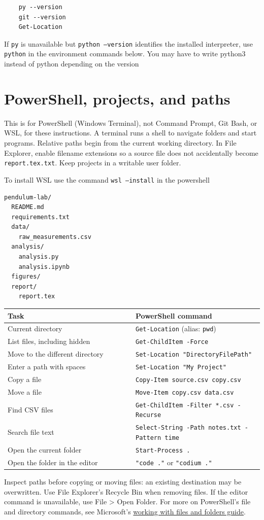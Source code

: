 \documentclass[11pt]{article}
\begin{document}
  \begin{lstlisting}
    py --version
    git --version
    Get-Location
  \end{lstlisting}
  If \texttt{py} is unavailable but \texttt{python --version} identifies the installed interpreter, use \texttt{python} in the environment commands below.
  You may have to write python3 instead of python depending on the version
\newpage


\section{PowerShell, projects, and paths}
This is for PowerShell (Windows Terminal), not Command Prompt,
Git Bash, or WSL, for these instructions. A terminal runs a shell to navigate
folders and start programs. Relative paths begin from the current working
directory. In File Explorer, enable filename extensions so a source file does
not accidentally become \texttt{report.tex.txt}. Keep projects in a writable
user folder.

To install WSL use the command \texttt{wsl --install} in the powershell

\begin{lstlisting}
pendulum-lab/
  README.md
  requirements.txt
  data/
    raw_measurements.csv
  analysis/
    analysis.py
    analysis.ipynb
  figures/
  report/
    report.tex
\end{lstlisting}

\begin{longtable}{p{0.50\linewidth}p{0.64\linewidth}}
\toprule Task & PowerShell command\\ \midrule
Current directory & \texttt{Get-Location} (alias: \texttt{pwd})\\
List files, including hidden & \texttt{Get-ChildItem -Force}\\
Move to the different directory & \texttt{Set-Location "DirectoryFilePath"}\\
Enter a path with spaces & \texttt{Set-Location "My Project"}\\
Copy a file & \texttt{Copy-Item source.csv copy.csv}\\
Move a file & \texttt{Move-Item copy.csv data.csv}\\
Find CSV files & \texttt{Get-ChildItem -Filter *.csv -Recurse}\\
Search file text & \texttt{Select-String -Path notes.txt -Pattern time}\\
Open the current folder & \texttt{Start-Process .}\\
Open the folder in the editor & \texttt{"code ."} or \texttt{"codium ."}\\
\bottomrule
\end{longtable}
Inspect paths before copying or moving files: an existing destination may be
overwritten. Use File Explorer's Recycle Bin when removing files. If the
editor command is unavailable, use File > Open Folder.
For more on PowerShell's file and directory commands, see Microsoft's
\href{https://learn.microsoft.com/en-us/powershell/}{working
with files and folders guide}.
\end{document}
